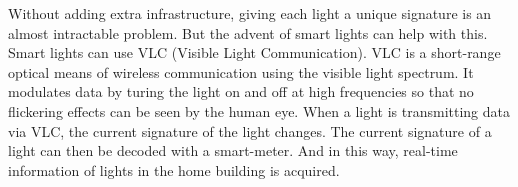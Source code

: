 Without adding extra infrastructure, giving each light a unique signature is an almost intractable problem.
But the advent of smart lights can help with this.
Smart lights can use VLC (Visible Light Communication).
VLC is a short-range optical means of wireless communication using the visible light spectrum.
It modulates data by turing the light on and off at high frequencies so that no flickering effects can be seen by the human eye.
When a light is transmitting data via VLC, the current signature of the light changes.
The current signature of a light can then be decoded with a smart-meter.
And in this way, real-time information of lights in the home building is acquired.












